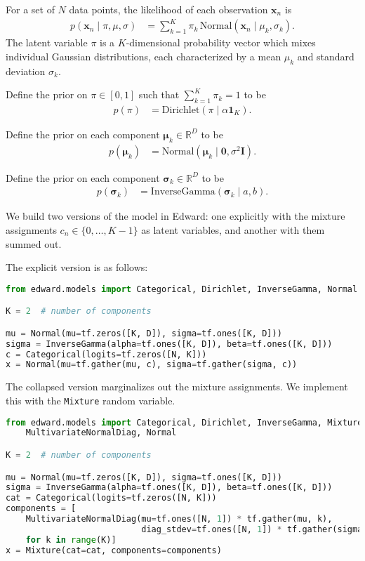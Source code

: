 For a set of $N$ data points,
the likelihood of each observation $\mathbf{x}_n$ is
\begin{align*}
  p(\mathbf{x}_n \mid \pi, \mu, \sigma)
  &=
  \sum_{k=1}^K \pi_k \, \text{Normal}(\mathbf{x}_n \mid \mu_k, \sigma_k).
\end{align*}
The latent variable $\pi$ is a $K$-dimensional probability vector
which mixes individual Gaussian distributions, each
characterized by a mean $\mu_k$ and standard deviation $\sigma_k$.

Define the prior on $\pi\in[0,1]$ such that $\sum_{k=1}^K\pi_k=1$ to be
\begin{align*}
  p(\pi)
  &=
  \text{Dirichlet}(\pi \mid \alpha \mathbf{1}_{K}).
\end{align*}

Define the prior on each component $\mathbf{\mu}_k\in\mathbb{R}^D$ to be
\begin{align*}
  p(\mathbf{\mu}_k)
  &=
  \text{Normal}(\mathbf{\mu}_k \mid \mathbf{0}, \sigma^2\mathbf{I}).
\end{align*}

Define the prior on each component $\mathbf{\sigma}_k\in\mathbb{R}^D$ to be
\begin{align*}
  p(\mathbf{\sigma}_k)
  &=
  \text{InverseGamma}(\mathbf{\sigma}_k \mid a, b).
\end{align*}

We build two versions of the model in Edward: one explicitly with the
mixture assignments $c_n\in\{0,\ldots,K-1\}$ as latent variables,
and another with them summed out.

The explicit version is as follows:

\begin{lstlisting}[language=Python]
from edward.models import Categorical, Dirichlet, InverseGamma, Normal

K = 2  # number of components

mu = Normal(mu=tf.zeros([K, D]), sigma=tf.ones([K, D]))
sigma = InverseGamma(alpha=tf.ones([K, D]), beta=tf.ones([K, D]))
c = Categorical(logits=tf.zeros([N, K]))
x = Normal(mu=tf.gather(mu, c), sigma=tf.gather(sigma, c))
\end{lstlisting}

The collapsed version marginalizes out the mixture assignments. We
implement this with the \texttt{Mixture} random variable.

\begin{lstlisting}[language=Python]
from edward.models import Categorical, Dirichlet, InverseGamma, Mixture, \
    MultivariateNormalDiag, Normal

K = 2  # number of components

mu = Normal(mu=tf.zeros([K, D]), sigma=tf.ones([K, D]))
sigma = InverseGamma(alpha=tf.ones([K, D]), beta=tf.ones([K, D]))
cat = Categorical(logits=tf.zeros([N, K]))
components = [
    MultivariateNormalDiag(mu=tf.ones([N, 1]) * tf.gather(mu, k),
                           diag_stdev=tf.ones([N, 1]) * tf.gather(sigma, k))
    for k in range(K)]
x = Mixture(cat=cat, components=components)
\end{lstlisting}

